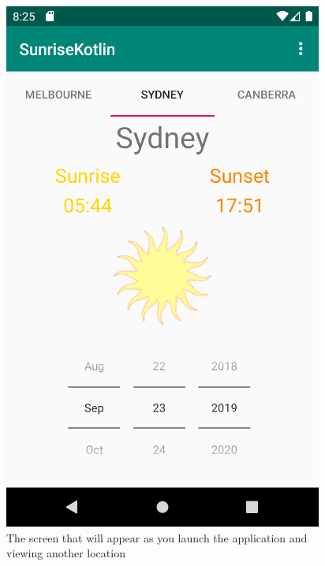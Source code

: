 \documentclass{scrartcl}
\begin{document}
\begin{figure}[h]
    \includegraphics[scale=0.5]{images/screen2.png}
    \caption{The screen that will appear as you launch the application and viewing another location}
\end{figure}

\pagebreak
\end{document}
